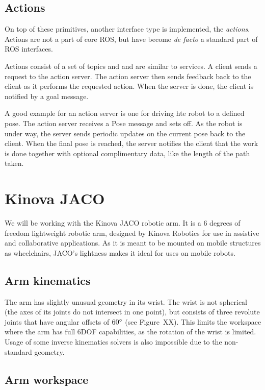 \documentclass[buriama8_dp.tex]{subfiles}
\begin{document}
\subsection{Actions}
\label{subsec:ros_actions}

On top of these primitives, another interface type is implemented, the \emph{actions}. Actions are not a part of core ROS, but have become \emph{de facto} a standard part of ROS interfaces. 

 Actions consist of a set of topics and and are similar to services. A client sends a request to the action server. The action server then sends feedback back to the client as it performs the requested action. When the server is done, the client is notified by a goal message.

A good example for an action server is one for driving hte robot to a defined pose. The action server receives a Pose message and sets off. As the robot is under way, the server sends periodic updates on the current pose back to the client. When the final pose is reached, the server notifies the client that the work is done together with optional complimentary data, like the length of the path taken.


\section{Kinova JACO}
We will be working with the Kinova JACO robotic arm. It is a 6 degrees of freedom lightweight robotic arm, designed by Kinova Robotics for use in assistive and collaborative applications. As it is meant to be mounted on mobile structures as wheelchairs, JACO's lightness makes it ideal for uses on mobile robots.

\subsection{Arm kinematics}
\label{subsec:arm_kinematics}

The arm has slightly unusual geometry in its wrist. The wrist is not spherical (the axes of its joints do not intersect in one point), but consists of three revolute joints that have angular offsets of \(60^\circ\) (see Figure~XX). This limits the workspace where the arm has full 6DOF capabilities, as the rotation of the wrist is limited. Usage of some inverse kinematics solvers is also impossible due to the non-standard geometry.

\subsection{Arm workspace}
\TODO{}
\end{document}
